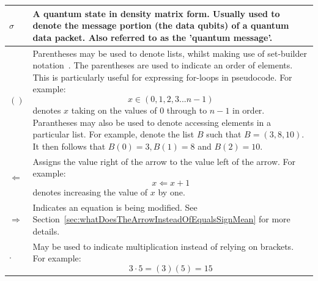 \begin{xltabular}{\linewidth}{ l | X }
$\sigma$ & A quantum state in density matrix form. Usually used to denote the message portion (the data qubits) of a quantum data packet. Also referred to as the 'quantum message'.
\\ \hline

$()$ & Parentheses may be used to denote lists, whilst making use of set-builder notation~\cite{setBuilderNotationWikipedia}. The parentheses are used to indicate an order of elements. This is particularly useful for expressing for-loops in pseudocode. For example:
$$x \in (0,1,2,3... n-1)$$
denotes $x$ taking on the values of $0$ through to $n-1$ in order.
Parantheses may also be used to denote accessing elements in a particular list. For example, denote the list $B$ such that $B = (3,8,10)$. It then follows that $B(0) = 3, B(1) = 8$ and $B(2) = 10$.
\\ \hline

$\Longleftarrow$ & Assigns the value right of the arrow to the value left of the arrow. For example: $$x \Longleftarrow x + 1$$ denotes increasing the value of $x$ by one.
\\ \hline

$\Rightarrow$ & Indicates an equation is being modified. See Section~\ref{sec:whatDoesTheArrowInsteadOfEqualsSignMean} for more details.
\\ \hline

$\cdot$ & May be used to indicate multiplication instead of relying on brackets. For example: $$3 \cdot 5 = (3)(5) = 15$$
\\ \hline

\end{xltabular}



